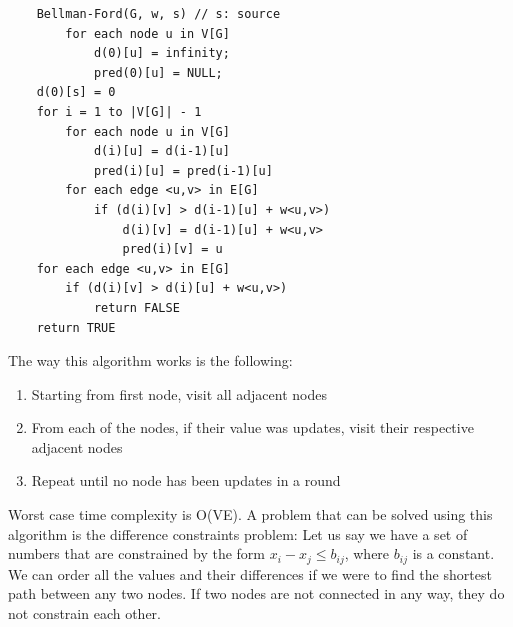 \documentclass[nobib]{tufte-handout}
\begin{document}
\begin{lstlisting}
    Bellman-Ford(G, w, s) // s: source
        for each node u in V[G]
            d(0)[u] = infinity; 
            pred(0)[u] = NULL;
    d(0)[s] = 0
    for i = 1 to |V[G]| - 1
        for each node u in V[G]
            d(i)[u] = d(i-1)[u]
            pred(i)[u] = pred(i-1)[u]
        for each edge <u,v> in E[G]
            if (d(i)[v] > d(i-1)[u] + w<u,v>)
                d(i)[v] = d(i-1)[u] + w<u,v>
                pred(i)[v] = u
    for each edge <u,v> in E[G]
        if (d(i)[v] > d(i)[u] + w<u,v>)
            return FALSE
    return TRUE
\end{lstlisting}
The way this algorithm works is the following:
\begin{enumerate}
    \item Starting from first node, visit all adjacent nodes
    \item From each of the nodes, if their value was updates, visit their respective adjacent nodes
    \item Repeat until no node has been updates in a round
\end{enumerate}
Worst case time complexity is O(VE).
A problem that can be solved using this algorithm is the difference constraints problem:
Let us say we have a set of numbers that are constrained by the form $x_i-x_j \leq b_{ij}$, where $b_{ij}$ is a constant.\\
We can order all the values and their differences if we were to find the shortest path between any two nodes. If two nodes are not connected in any way, they do not constrain each other.\\
\end{document}
